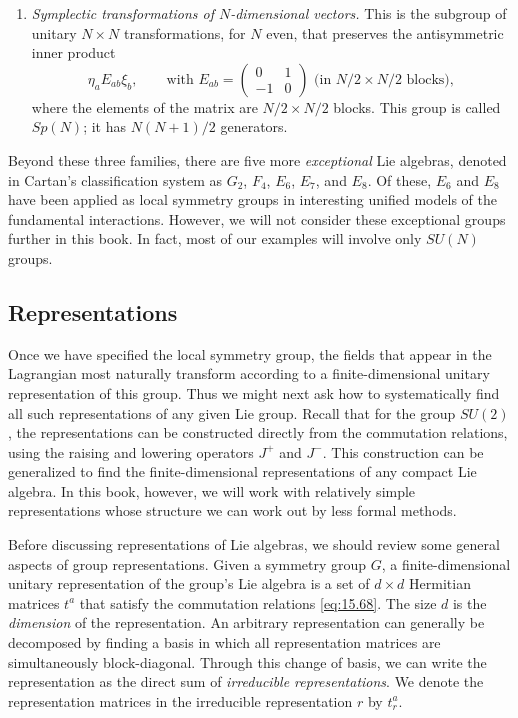 \begin{enumerate}
    $O(N)$.)  There is an independent rotation corresponding to each plane in
    $N$ dimensions, so $SO(N)$ has $N(N-1)/2$ generators.
  \item \emph{Symplectic transformations of $N$-dimensional vectors.}  This
    is the subgroup of unitary $N\times N$ transformations, for $N$ even,
    that preserves the antisymmetric inner product
    \begin{equation}
      \eta_a E_{ab}\xi_b,
      \qquad\text{with } E_{ab} = \begin{pmatrix}0&1\\-1&0\end{pmatrix}
      \text{ (in } N/2\times N/2 \text{ blocks)},
      \label{eq:15.76}
    \end{equation}
    where the elements of the matrix are $N/2\times N/2$ blocks.  This group
    is called $Sp(N)$; it has $N(N+1)/2$ generators.
\end{enumerate}

Beyond these three families, there are five more \emph{exceptional} Lie
algebras, denoted in Cartan's classification system as $G_2$, $F_4$, $E_6$,
$E_7$, and $E_8$.  Of these, $E_6$ and $E_8$ have been applied as local
symmetry groups in interesting unified models of the fundamental
interactions.  However, we will not consider these exceptional groups further
in this book.  In fact, most of our examples will involve only $SU(N)$
groups.

\subsection{Representations}

Once we have specified the local symmetry group, the fields that appear in
the Lagrangian most naturally transform according to a finite-dimensional
unitary representation of this group.  Thus we might next ask how to
systematically find all such representations of any given Lie group.  Recall
that for the group $SU(2)$, the representations can be constructed directly
from the commutation relations, using the raising and lowering operators
$J^+$ and $J^-$.  This construction can be generalized to find the
finite-dimensional representations of any compact Lie algebra.  In this book,
however, we will work with relatively simple representations whose structure
we can work out by less formal methods.

Before discussing representations of Lie algebras, we should review some
general aspects of group representations.  Given a symmetry group $G$, a
finite-dimensional unitary representation of the group's Lie algebra is a set
of $d\times d$ Hermitian matrices $t^a$ that satisfy the commutation
relations \eqref{eq:15.68}.  The size $d$ is the \emph{dimension} of the
representation.  An arbitrary representation can generally be decomposed by
finding a basis in which all representation matrices are simultaneously
block-diagonal.  Through this change of basis, we can write the
representation as the direct sum of \emph{irreducible representations}.  We
denote the representation matrices in the irreducible representation $r$ by
$t^a_r$.

